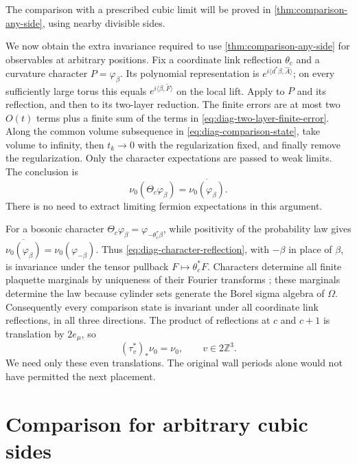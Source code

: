 \documentclass[11pt,letterpaper,reqno]{amsart}
\newcommand{\Z}{\mathbb Z}
\begin{document}
The comparison with a prescribed cubic limit will be proved in
\cref{thm:comparison-any-side}, using nearby divisible sides.

We now obtain the extra invariance required to use
\cref{thm:comparison-any-side} for observables at arbitrary
positions. Fix a coordinate link reflection $\theta_c$
and a curvature character $P=\varphi_\beta$. Its polynomial
representation is $e^{i\langle d^*\beta,\widehat A\rangle}$;
on every sufficiently large torus this equals
$e^{i\langle\beta,\widetilde F\rangle}$ on the local lift.
Apply  to $P$
and its reflection, and then
 to its two-layer
reduction. The finite errors are at most two $O(t)$ terms
plus a finite sum of the terms in
\eqref{eq:diag-two-layer-finite-error}. Along the common
volume subsequence in \eqref{eq:diag-comparison-state},
take volume to infinity, then $t_k\to0$ with the regularization
fixed, and finally remove the regularization. Only the
character expectations are passed to weak limits. The
conclusion is
\begin{equation}\label{eq:diag-character-reflection}
 \nu_0(\Theta_c\varphi_\beta)
                           =\overline{\nu_0(\varphi_\beta)}.
\end{equation}
There is no need to extract limiting fermion expectations
in this argument.

For a bosonic character
$\Theta_c\varphi_\beta=\varphi_{-\theta_c^*\beta}$, while
positivity of the probability law gives
$\overline{\nu_0(\varphi_\beta)}=\nu_0(\varphi_{-\beta})$.
Thus \eqref{eq:diag-character-reflection}, with $-\beta$
in place of $\beta$, is invariance under the tensor pullback
$F\mapsto\theta_c^*F$. Characters determine all finite
plaquette marginals by uniqueness of their Fourier
transforms \cite[Theorem~6.2]{Potzelberger}; these marginals determine the law because
cylinder sets generate the Borel sigma algebra of $\Omega$.
Consequently every comparison state is invariant under
all coordinate link reflections, in all three directions.
The product of reflections at $c$ and $c+1$ is translation
by $2e_\mu$, so
\begin{equation}\label{eq:diag-even-translation}
 (\tau_v^*)_*\nu_0=\nu_0,\qquad v\in2\Z^3.
\end{equation}
We need only these even translations. The original wall
periods alone would not have permitted the next placement.

\section{Comparison for arbitrary cubic sides}\label{sec:different-sides}
\end{document}
